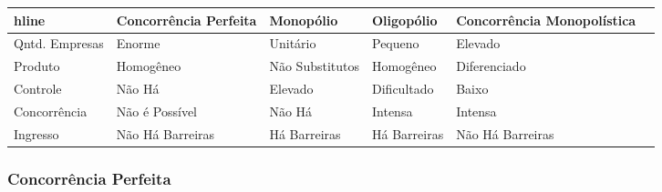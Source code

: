 \documentclass{article}
\begin{document}
                \begin{table}[H]
                    \centering  
                    \begin{tabular}[]{l|lllll}hline
                                       & Concorrência Perfeita & Monopólio       & Oligopólio   & Concorrência Monopolística\\\hline
                        Qntd. Empresas & Enorme                & Unitário        & Pequeno      & Elevado\\
                        Produto        & Homogêneo             & Não Substitutos & Homogêneo    & Diferenciado\\
                        Controle       & Não Há                & Elevado         & Dificultado  & Baixo\\
                        Concorrência   & Não é Possível        & Não Há          & Intensa      & Intensa\\
                        Ingresso       & Não Há Barreiras      & Há Barreiras    & Há Barreiras & Não Há Barreiras\\\hline
                    \end{tabular}
                \end{table}

        \subsubsection{Concorrência Perfeita}
\end{document}
